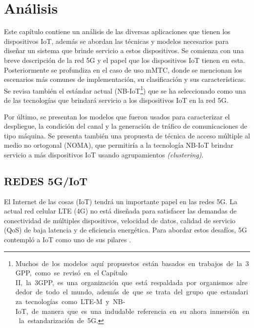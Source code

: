 \chapter{Análisis} %
\label{Chapter4} %

Este capítulo contiene un análisis de las diversas aplicaciones que tienen los dispositivos IoT, además se abordan las técnicas y modelos necesarios para diseñar un sistema que brinde servicio a estos dispositivos. Se comienza con una breve descripción de la red 5G y el papel que los dispositivos IoT tienen en esta. Posteriormente se profundiza en el caso de uso mMTC, donde se mencionan los escenarios más comunes de implementación, su clasificación y sus características. Se revisa también el estándar actual (NB-IoT\footnote{ Muchos\ de\ los\ modelos\ aqu\textrm{í}\ propuestos\ est\textrm{á}n\ basados\ en\ trabajos\ de\ la\ 3GPP,\ como\ se\ revis\textrm{ó}\ en\ el Capítulo II,\ la\ 3GPP,\ es\ una\ organizaci\textrm{ó}n\ que\ est\textrm{á}\ respaldada\ por\ organismos\ alrededor\ de\ todo\ el\ mundo,\ adem\textrm{á}s\ de\ que\ se\ trata\ del\ grupo\ que\ estandariza\ tecnolog\textrm{í}as\ como\ LTE-M\ y\ NB-IoT,\ de\ manera\ que\ es\ una\ indudable\ referencia\ en\ su\ ahora\ inmersi\textrm{ó}n\ en\ la\ estandarizaci\textrm{ó}n\ de\ 5G.}) que se ha seleccionado como una de las tecnologías que brindará servicio a los dispositivos IoT en la red 5G. \newline

Por último, se presentan los modelos que fueron usados para caracterizar el despliegue, la condición del canal y la generación de tráfico de comunicaciones de tipo máquina. Se presenta también una propuesta de técnica de acceso múltiple al medio no ortogonal (NOMA), que permitiría a la tecnología NB-IoT brindar servicio a más dispositivos IoT usando agrupamientos \textit{(clustering)}.


\section{REDES 5G/IoT}

El Internet de las cosas (IoT) tendrá un importante papel en las redes 5G. La actual red celular LTE (4G) no está diseñada para satisfacer las demandas de conectividad de múltiples dispositivos, velocidad de datos, calidad de servicio (QoS) de baja latencia y de eficiencia energética. Para abordar estos desafíos, 5G contempló a IoT como uno de sus pilares \parencite{Chetri2020}. \newline


